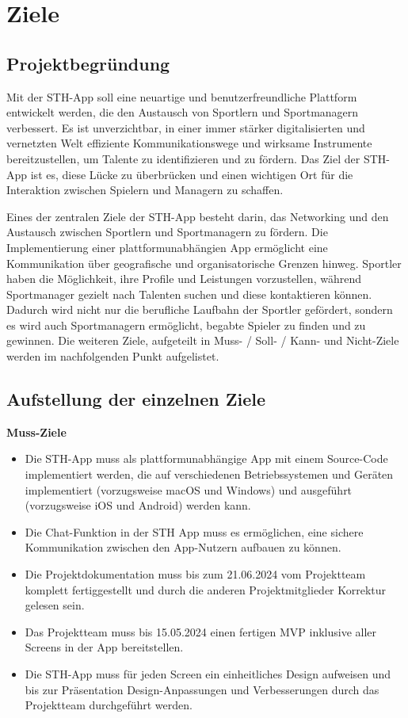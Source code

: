 \chapter{Ziele}
\section{Projektbegründung}
Mit der STH-App soll eine neuartige und benutzerfreundliche Plattform entwickelt werden, die den Austausch von Sportlern und Sportmanagern verbessert.
Es ist unverzichtbar, in einer immer stärker digitalisierten und vernetzten Welt effiziente Kommunikationswege und wirksame Instrumente bereitzustellen, um Talente zu identifizieren und zu fördern.
Das Ziel der STH-App ist es, diese Lücke zu überbrücken und einen wichtigen Ort für die Interaktion zwischen Spielern und Managern zu schaffen.

\noindent
Eines der zentralen Ziele der STH-App besteht darin, das Networking und den Austausch zwischen Sportlern und Sportmanagern zu fördern.
Die Implementierung einer plattformunabhängien App ermöglicht eine Kommunikation über geografische und organisatorische Grenzen hinweg.
Sportler haben die Möglichkeit, ihre Profile und Leistungen vorzustellen, während Sportmanager gezielt nach Talenten suchen und diese kontaktieren können.
Dadurch wird nicht nur die berufliche Laufbahn der Sportler gefördert, sondern es wird auch Sportmanagern ermöglicht, begabte Spieler zu finden und zu gewinnen.
\newline
Die weiteren Ziele, aufgeteilt in Muss- / Soll- / Kann- und Nicht-Ziele werden im nachfolgenden Punkt aufgelistet.

\section{Aufstellung der einzelnen Ziele}
\textbf{Muss-Ziele}
\begin{itemize}
    \item Die STH-App muss als plattformunabhängige App mit einem Source-Code implementiert werden, die auf verschiedenen Betriebssystemen und Geräten implementiert (vorzugsweise macOS und Windows) und ausgeführt (vorzugsweise iOS und Android) werden kann.
    \item Die Chat-Funktion in der STH App muss es ermöglichen, eine sichere Kommunikation zwischen den App-Nutzern aufbauen zu können.
    \item Die Projektdokumentation muss bis zum 21.06.2024 vom Projektteam komplett fertiggestellt und durch die anderen Projektmitglieder Korrektur gelesen sein.
    \item Das Projektteam muss bis 15.05.2024 einen fertigen MVP inklusive aller Screens in der App bereitstellen.
    \item Die STH-App muss für jeden Screen ein einheitliches Design aufweisen und bis zur Präsentation Design-Anpassungen und Verbesserungen durch das Projektteam durchgeführt werden.
\end{itemize}

